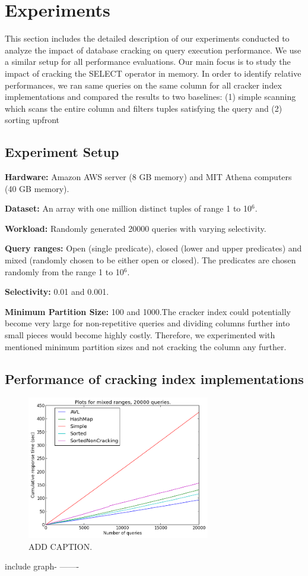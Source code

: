 \section{Experiments}
This section includes the detailed description of our experiments conducted to analyze the impact of database cracking on query execution performance. We use a similar setup for all performance evaluations. Our main focus is to study the impact of cracking the SELECT operator in memory. In order to identify relative performances, we ran same queries on the same column for all cracker index implementations and compared the results to two baselines: (1) simple scanning which scans the entire column and filters tuples satisfying the query and (2) sorting upfront 

\subsection{Experiment Setup}

\textbf{Hardware:} Amazon AWS server (8 GB memory) and MIT Athena computers (40 GB memory). 

\textbf{Dataset:} An array with one million distinct tuples of range 1 to 10${^6}$. 

\textbf{Workload:} Randomly generated 20000 queries with varying selectivity.

\textbf{Query ranges:} Open (single predicate), closed (lower and upper predicates) and mixed (randomly chosen to be either open or closed).
The predicates are chosen randomly from the range 1 to 10${^6}$.

\textbf{Selectivity:} 0.01 and 0.001. 

\textbf{Minimum Partition Size: } 100 and 1000.The cracker index could potentially become very large for non-repetitive queries and dividing columns further into small pieces would become highly costly. Therefore, we experimented with mentioned minimum partition sizes and not cracking the column any further.
\subsection{Performance of cracking index implementations}

\begin{figure}[h]
\includegraphics[width=8cm]{figures/mixed20000}
\caption{ADD CAPTION.}
\label{fig:mixed20000}
\end{figure}
include graph- -------

